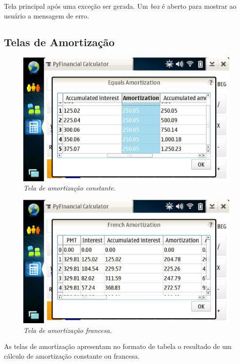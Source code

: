 Tela principal após uma exceção ser gerada. Um \textit{box} é aberto para mostrar ao usuário a mensagem de erro.

\subsection{Telas de Amortização}

\begin{figure}[!h]
 \includegraphics[scale=0.55]{tela_cas.eps}
 \caption{\it Tela de amortização constante.} \label{tab:tela_cas}
\end{figure}

\begin{figure}[!h]
 \includegraphics[scale=0.55]{tela_fas.eps}
 \caption{\it Tela de amortização francesa.} \label{tab:tela_fas}
\end{figure}


As telas de amortização apresentam no formato de tabela o resultado de um cálculo de
amortização constante ou francesa.

